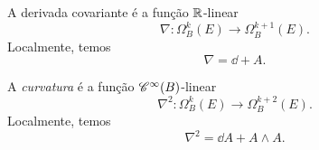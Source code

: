 \cleardoublepage


A derivada covariante é a função $\mathbb{R}$-linear
	\begin{equation*}
	\nabla\colon \Omega^k_B(E) \to \Omega^{k+1}_B(E).
	\end{equation*}
Localmente, temos
	\begin{equation*}
	\nabla = \dd + A.
	\end{equation*}

A \emph{curvatura} é a função $\mathscr{C}^\infty(B)$-linear
	\begin{equation*}
	\nabla^2\colon \Omega^k_B(E) \to \Omega^{k+2}_B(E).
	\end{equation*}
Localmente, temos
	\begin{equation*}
	\nabla^2 = \dd A + A \wedge A.
	\end{equation*}






































